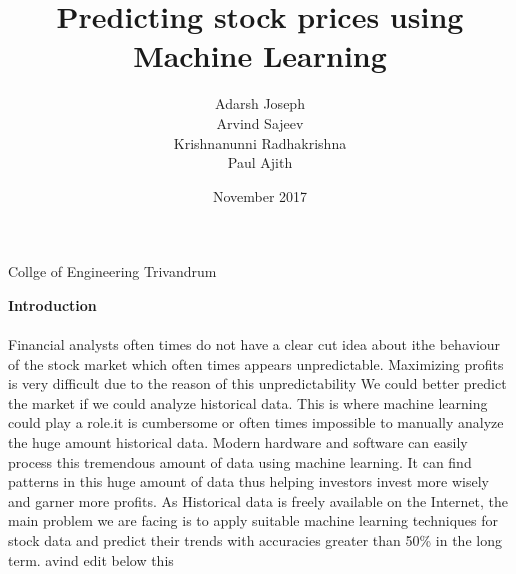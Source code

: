 \documentclass[]{article}
\begin{document}
\title{Predicting stock prices using Machine Learning}
\author{Adarsh Joseph \\Arvind Sajeev \\Krishnanunni Radhakrishna\\Paul Ajith}
\date{November 2017}
\begin{titlepage}
\maketitle
\begin{center}

{\large Collge of Engineering Trivandrum}

\end{center}

\end{titlepage}
\textbf{{\large Introduction}}\\ \\
Financial analysts often times do not have a clear cut idea about ithe behaviour of the stock market which often times appears unpredictable. Maximizing profits is very difficult due to the reason of this unpredictability We could better predict the market if we could analyze historical data. This is where machine learning could play a role.it is cumbersome or often times impossible to manually analyze the huge amount historical data. Modern hardware
and software can easily process this tremendous amount of data using machine learning. It can find patterns in this huge amount of data thus helping investors invest more wisely and garner more profits. As Historical data is freely available on the Internet, the main problem we are facing is to apply suitable machine learning techniques for stock data and predict their trends with accuracies greater than 50\% in the long term.
\newpage
avind edit below this
\end{document}

